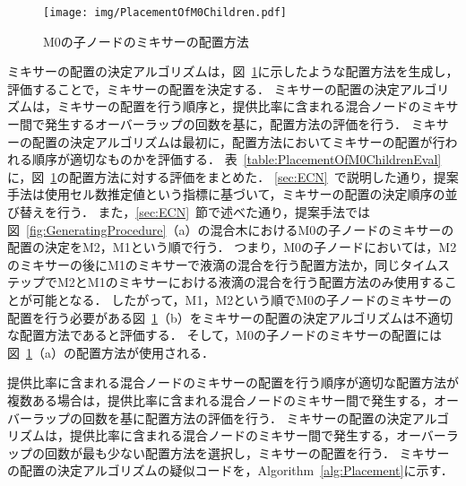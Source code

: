 \begin{figure}[tbp]
    \centering\texttt{[image: img/PlacementOfM0Children.pdf]}
 \caption{M0の子ノードのミキサーの配置方法}\label{fig:PlacementOfM0Children}
\end{figure}


ミキサーの配置の決定アルゴリズムは，図~\ref{fig:PlacementOfM0Children}に示したような配置方法を生成し，評価することで，ミキサーの配置を決定する．
ミキサーの配置の決定アルゴリズムは，ミキサーの配置を行う順序と，提供比率に含まれる混合ノードのミキサー間で発生するオーバーラップの回数を基に，配置方法の評価を行う．
ミキサーの配置の決定アルゴリズムは最初に，配置方法においてミキサーの配置が行われる順序が適切なものかを評価する．
表~\ref{table:PlacementOfM0ChildrenEval}に，図~\ref{fig:PlacementOfM0Children}の配置方法に対する評価をまとめた．
\ref{sec:ECN}~で説明した通り，提案手法は使用セル数推定値という指標に基づいて，ミキサーの配置の決定順序の並び替えを行う．
また，\ref{sec:ECN}~節で述べた通り，提案手法では図~\ref{fig:GeneratingProcedure}（a）の混合木におけるM0の子ノードのミキサーの配置の決定をM2，M1という順で行う．
つまり，M0の子ノードにおいては，M2のミキサーの後にM1のミキサーで液滴の混合を行う配置方法か，同じタイムステップでM2とM1のミキサーにおける液滴の混合を行う配置方法のみ使用することが可能となる．
したがって，M1，M2という順でM0の子ノードのミキサーの配置を行う必要がある図~\ref{fig:PlacementOfM0Children}（b）をミキサーの配置の決定アルゴリズムは不適切な配置方法であると評価する．
そして，M0の子ノードのミキサーの配置には図~\ref{fig:PlacementOfM0Children}（a）の配置方法が使用される．

提供比率に含まれる混合ノードのミキサーの配置を行う順序が適切な配置方法が複数ある場合は，提供比率に含まれる混合ノードのミキサー間で発生する，オーバーラップの回数を基に配置方法の評価を行う．
ミキサーの配置の決定アルゴリズムは，提供比率に含まれる混合ノードのミキサー間で発生する，オーバーラップの回数が最も少ない配置方法を選択し，ミキサーの配置を行う．
ミキサーの配置の決定アルゴリズムの疑似コードを，Algorithm~\ref{alg:Placement}に示す．

